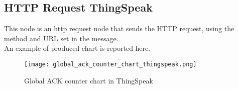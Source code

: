 \subsection{HTTP Request ThingSpeak}
This node is an http request node that sends the HTTP request, using the method and URL set in the message.\\
An example of produced chart is reported here.
\begin{figure}[H]
    \centering
    \texttt{[image: global\_ack\_counter\_chart\_thingspeak.png]}
    \caption{Global ACK counter chart in ThingSpeak}
\end{figure}



